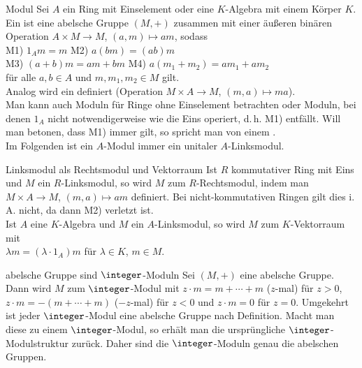 \begin{Def}{Modul}
    Sei $A$ ein Ring mit Einselement oder eine $K$-Algebra mit einem Körper
    $K$.
    Ein  ist eine abelsche Gruppe $(M, +)$ zusammen mit
    einer äußeren binären Operation $A \times M \rightarrow M$,
    $(a, m) \mapsto am$, sodass \\
    M1) $1_A m = m$ \qquad\qquad\qquad\;\;
    M2) $a(bm) = (ab)m$ \\
    M3) $(a + b)m = am + bm$ \qquad
    M4) $a(m_1 + m_2) = am_1 + am_2$ \\
    für alle $a, b \in A$ und $m, m_1, m_2 \in M$ gilt. \\
    Analog wird ein  definiert
    (Operation $M \times A \rightarrow M$, $(m, a) \mapsto ma$). \\
    Man kann auch Moduln für Ringe ohne Einselement betrachten oder
    Moduln, bei denen $1_A$ nicht notwendigerweise wie die Eins operiert,
    d.\,h. M1) entfällt.
    Will man betonen, dass M1) immer gilt, so spricht man von
    einem . \\
    Im Folgenden ist ein $A$-Modul immer ein unitaler $A$-Linksmodul.
\end{Def}

\begin{Satz}{Linksmodul als Rechtsmodul und Vektorraum}
    Ist $R$ kommutativer Ring mit Eins und $M$ ein $R$-Linksmodul,
    so wird $M$ zum $R$-Rechtsmodul, indem man $M \times A \rightarrow M$,
    $(m, a) \mapsto am$ definiert.
    Bei nicht-kommutativen Ringen gilt dies i.\,A. nicht, da
    dann M2) verletzt ist. \\
    Ist $A$ eine $K$-Algebra und $M$ ein $A$-Linksmodul,
    so wird $M$ zum $K$-Vektorraum mit \\
    $\lambda m = (\lambda \cdot 1_A) m$ für $\lambda \in K$, $m \in M$.
\end{Satz}

\begin{Satz}{abelsche Gruppe sind $\integer$-Moduln}
    Sei $(M, +)$ eine abelsche Gruppe. \\
    Dann wird $M$ zum $\integer$-Modul mit
    $z \cdot m = m + \dotsb + m$ ($z$-mal) für $z > 0$,
    $z \cdot m = -(m + \dotsb + m)$ ($-z$-mal) für $z < 0$
    und $z \cdot m = 0$ für $z = 0$.
    Umgekehrt ist jeder $\integer$-Modul eine abelsche Gruppe nach Definition.
    Macht man diese zu einem $\integer$-Modul, so erhält man die
    ursprüngliche $\integer$-Modulstruktur zurück.
    Daher sind die $\integer$-Moduln genau die abelschen Gruppen.
\end{Satz}

